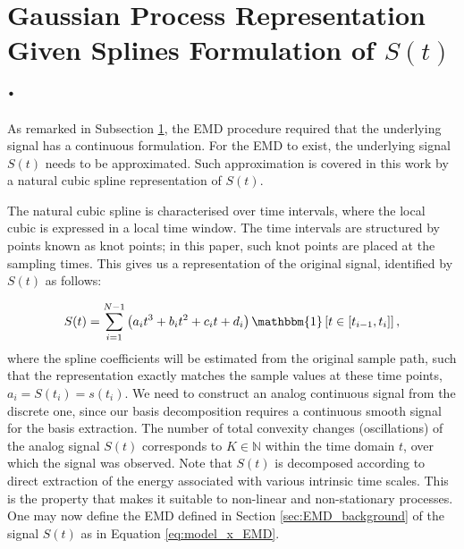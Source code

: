\section{Gaussian Process Representation Given Splines Formulation of $S(t)$.}
As remarked in Subsection \ref{}, the EMD procedure required that the underlying signal has a continuous formulation. For the EMD to exist, the underlying signal $S(t)$ needs to be approximated. Such approximation is covered in this work by a natural cubic spline representation of $S(t)$.

The natural cubic spline is characterised over time intervals, where the local cubic is expressed in a local time window. The time intervals are structured by points known as knot points; in this paper, such knot points are placed at the sampling times. This gives us a representation of the original signal, identified by $S(t)$ as follows:

\begin{equation}
\label{cubic_spl}
S(t) = \sum_{i=1}^{N-1} \left(a_i t^3 +b_i t^2 + c_i t +d_i \right) \mathbbm{1} \left[ t \in \left[ t_{i-1},t_i \right] \right],
\end{equation}
where the spline coefficients will be estimated from the original sample path, such that the representation exactly matches the sample values at these time points, $a_i = S(t_i) = s(t_i)$. We need to construct an analog continuous signal from the discrete one, since our basis decomposition requires a continuous smooth signal for the basis extraction. The number of total convexity changes (oscillations) of the analog signal $S(t)$ corresponds to $K \in \mathbb{N}$ within the time domain $t$, over which the signal was observed. Note that $S(t)$ is decomposed according to direct extraction of the energy associated with various intrinsic time scales. This is the property that makes it suitable to non-linear and non-stationary processes. One may now define the EMD defined in Section \ref{sec:EMD_background} of the signal $S(t)$ as in Equation \eqref{eq:model_x_EMD}.


